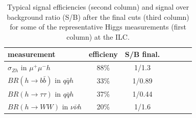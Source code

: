 \begin{table}
\begin{center}
\begin{tabular} {lcccccc}
measurement  & efficieny &  S/B final. \\
\hline
$\sigma_{Zh}$ in $\mu^+\mu^-h$  & 88\% & 1/1.3 \\
$BR(h\to b\bar{b})$ in $q\bar{q}h$ & 33\% & 1/0.89 \\
$BR(h\to\tau\tau)$ in $q\bar{q}h$ & 37\% &  1/0.44 \\
$BR(h\to WW)$ in $\nu\bar{\nu}h$ & 20\% &  1/1.6
\end{tabular}
\caption{Typical signal efficiencies (second column) and signal over background ratio (S/B) 
after the final cuts (third column) for some of the 
representative Higgs measurements (first column) at the ILC.}
\label{tab:ILCEffSB}
\end{center}
\end{table}

